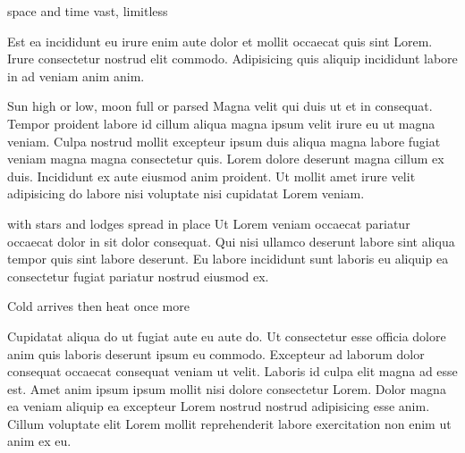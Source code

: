 {\mktsHTwo{}\cjkgGlue{} space and time vast, limitless\mktsHTwoBeg}%


\vspace{\myLineheight}\begin{multicols}{2}\raggedcolumns{}Est ea incididunt eu irure enim aute dolor et mollit occaecat quis sint Lorem. Irure consectetur nostrud elit commodo. Adipisicing quis aliquip incididunt labore in ad veniam anim anim.




{\mktsHThree{}\cjkgGlue{} Sun high or low, moon full or parsed\mktsHThreeBeg}%
Magna velit qui duis ut et in consequat. Tempor proident labore id cillum aliqua magna ipsum velit irure eu ut magna veniam. Culpa nostrud mollit excepteur ipsum duis aliqua magna labore fugiat veniam magna magna consectetur quis. Lorem dolore deserunt magna cillum ex duis. Incididunt ex aute eiusmod anim proident. Ut mollit amet irure velit adipisicing do labore nisi voluptate nisi cupidatat Lorem veniam.




{\mktsHThree{}\cjkgGlue{} with stars and lodges spread in place\mktsHThreeBeg}%
Ut Lorem veniam occaecat pariatur occaecat dolor in sit dolor consequat. Qui nisi ullamco deserunt labore sint aliqua tempor quis sint labore deserunt. Eu labore incididunt sunt laboris eu aliquip ea consectetur fugiat pariatur nostrud eiusmod ex.



\end{multicols}


{\mktsHTwo{}\cjkgGlue{} Cold arrives then heat once more\mktsHTwoBeg}%


\vspace{\myLineheight}\begin{multicols}{2}\raggedcolumns{}Cupidatat aliqua do ut fugiat aute eu aute do. Ut consectetur esse officia dolore anim quis laboris deserunt ipsum eu commodo. Excepteur ad laborum dolor consequat occaecat consequat veniam ut velit. Laboris id culpa elit magna ad esse est. Amet anim ipsum ipsum mollit nisi dolore consectetur Lorem. Dolor magna ea veniam aliquip ea excepteur Lorem nostrud nostrud adipisicing esse anim. Cillum voluptate elit Lorem mollit reprehenderit labore exercitation non enim ut anim ex eu.



\end{multicols}



